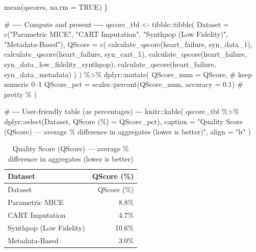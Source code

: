 \documentclass[
  letterpaper,
  DIV=11,
  numbers=noendperiod]{scrartcl}
\newenvironment{Shaded}{\begin{snugshade}}{\end{snugshade}}
\newcommand{\AttributeTok}[1]{\textcolor[rgb]{0.40,0.45,0.13}{#1}}
\newcommand{\CommentTok}[1]{\textcolor[rgb]{0.37,0.37,0.37}{#1}}
\newcommand{\ConstantTok}[1]{\textcolor[rgb]{0.56,0.35,0.01}{#1}}
\newcommand{\FloatTok}[1]{\textcolor[rgb]{0.68,0.00,0.00}{#1}}
\newcommand{\FunctionTok}[1]{\textcolor[rgb]{0.28,0.35,0.67}{#1}}
\newcommand{\NormalTok}[1]{\textcolor[rgb]{0.00,0.23,0.31}{#1}}
\newcommand{\OtherTok}[1]{\textcolor[rgb]{0.00,0.23,0.31}{#1}}
\newcommand{\SpecialCharTok}[1]{\textcolor[rgb]{0.37,0.37,0.37}{#1}}
\newcommand{\StringTok}[1]{\textcolor[rgb]{0.13,0.47,0.30}{#1}}
\begin{document}
\begin{Shaded}
\begin{Highlighting}[]
  \FunctionTok{mean}\NormalTok{(qscores, }\AttributeTok{na.rm =} \ConstantTok{TRUE}\NormalTok{)}
\NormalTok{\}}

\CommentTok{\# {-}{-}{-}{-} Compute and present {-}{-}{-}{-}}
\NormalTok{qscore\_tbl }\OtherTok{\textless{}{-}}\NormalTok{ tibble}\SpecialCharTok{::}\FunctionTok{tibble}\NormalTok{(}
  \AttributeTok{Dataset =} \FunctionTok{c}\NormalTok{(}\StringTok{"Parametric MICE"}\NormalTok{, }\StringTok{"CART Imputation"}\NormalTok{,}
              \StringTok{"Synthpop (Low Fidelity)"}\NormalTok{, }\StringTok{"Metadata{-}Based"}\NormalTok{),}
  \AttributeTok{QScore =} \FunctionTok{c}\NormalTok{(}
    \FunctionTok{calculate\_qscore}\NormalTok{(heart\_failure, syn\_data\_1),}
    \FunctionTok{calculate\_qscore}\NormalTok{(heart\_failure, syn\_cart\_1),}
    \FunctionTok{calculate\_qscore}\NormalTok{(heart\_failure, syn\_data\_low\_fidelity\_synthpop),}
    \FunctionTok{calculate\_qscore}\NormalTok{(heart\_failure, syn\_data\_metadata)}
\NormalTok{  )}
\NormalTok{) }\SpecialCharTok{\%\textgreater{}\%}
\NormalTok{  dplyr}\SpecialCharTok{::}\FunctionTok{mutate}\NormalTok{(}
    \AttributeTok{QScore\_num =}\NormalTok{ QScore,                                   }\CommentTok{\# keep numeric 0–1}
    \AttributeTok{QScore\_pct =}\NormalTok{ scales}\SpecialCharTok{::}\FunctionTok{percent}\NormalTok{(QScore\_num, }\AttributeTok{accuracy =} \FloatTok{0.1}\NormalTok{) }\CommentTok{\# pretty \%}
\NormalTok{  )}

\CommentTok{\# {-}{-}{-} User{-}friendly table (as percentages) {-}{-}{-}}
\NormalTok{knitr}\SpecialCharTok{::}\FunctionTok{kable}\NormalTok{(}
\NormalTok{  qscore\_tbl }\SpecialCharTok{\%\textgreater{}\%}\NormalTok{ dplyr}\SpecialCharTok{::}\FunctionTok{select}\NormalTok{(Dataset, }\StringTok{\textasciigrave{}}\AttributeTok{QScore (\%)}\StringTok{\textasciigrave{}} \OtherTok{=}\NormalTok{ QScore\_pct),}
  \AttributeTok{caption =} \StringTok{"Quality Score (QScore) — average \% difference in aggregates (lower is better)"}\NormalTok{,}
  \AttributeTok{align =} \StringTok{"lr"}
\NormalTok{)}
\end{Highlighting}
\end{Shaded}

\begin{longtable}[]{@{}lr@{}}
\caption{Quality Score (QScore) --- average \% difference in aggregates
(lower is better)}\tabularnewline
\toprule\noalign{}
Dataset & QScore (\%) \\
\midrule\noalign{}
\endfirsthead
\toprule\noalign{}
Dataset & QScore (\%) \\
\midrule\noalign{}
\endhead
\bottomrule\noalign{}
\endlastfoot
Parametric MICE & 8.8\% \\
CART Imputation & 4.7\% \\
Synthpop (Low Fidelity) & 10.6\% \\
Metadata-Based & 3.0\% \\
\end{longtable}
\end{document}
